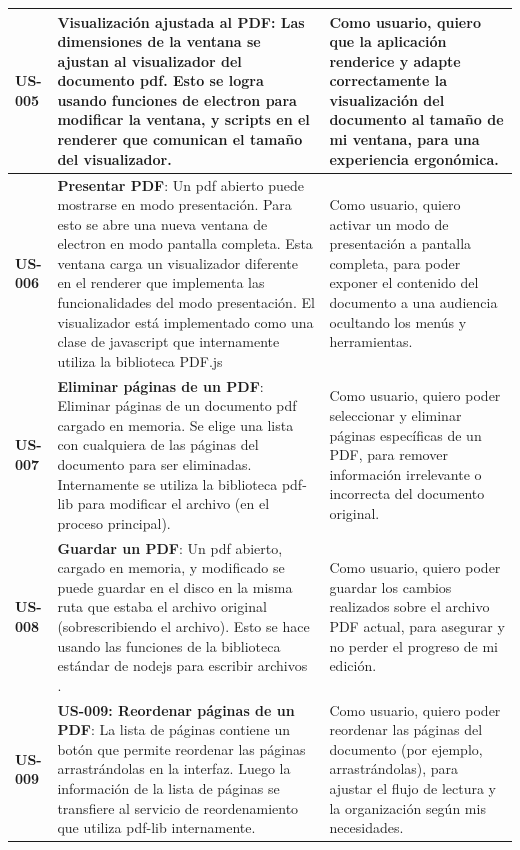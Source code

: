 \begin{longtable}{|l||p{7cm}|p{4.5cm}|}
\textbf{US-005} & \textbf{Visualización ajustada al PDF}: Las dimensiones de la ventana se ajustan al visualizador del documento pdf. Esto se logra usando funciones de electron para modificar la ventana, y scripts en el renderer que comunican el tamaño del visualizador. & Como usuario, quiero que la aplicación renderice y adapte correctamente la visualización del documento al tamaño de mi ventana, para una experiencia ergonómica.\\
\hline
\textbf{US-006} & \textbf{Presentar PDF}:  Un pdf abierto puede mostrarse en modo presentación. Para esto se abre una nueva ventana de electron en modo pantalla completa. Esta ventana carga un visualizador diferente en el renderer que implementa las funcionalidades del modo presentación. El visualizador está implementado como una clase de javascript que internamente utiliza la biblioteca PDF.js & Como usuario, quiero activar un modo de presentación a pantalla completa, para poder exponer el contenido del documento a una audiencia ocultando los menús y herramientas.\\
\hline
\textbf{US-007} & \textbf{Eliminar páginas de un PDF}:  Eliminar páginas de un documento pdf cargado en memoria. Se elige una lista con cualquiera de las páginas del documento para ser eliminadas. Internamente se utiliza la biblioteca pdf-lib para modificar el archivo (en el proceso principal). & Como usuario, quiero poder seleccionar y eliminar páginas específicas de un PDF, para remover información irrelevante o incorrecta del documento original.\\
\hline
\hline
\textbf{US-008} & \textbf{Guardar un PDF}:  Un pdf abierto, cargado en memoria, y modificado se puede guardar en el disco en la misma ruta que estaba el archivo original (sobrescribiendo el archivo). Esto se hace usando las funciones de la biblioteca estándar de nodejs para escribir archivos .& Como usuario, quiero poder guardar los cambios realizados sobre el archivo PDF actual, para asegurar y no perder el progreso de mi edición.\\
\hline
\hline
\textbf{US-009} & \textbf{US-009: Reordenar páginas de un PDF}: La lista de páginas contiene un botón que permite reordenar las páginas arrastrándolas en la interfaz. Luego la información de la lista de páginas se transfiere al servicio de reordenamiento que utiliza pdf-lib internamente.  & Como usuario, quiero poder reordenar las páginas del documento (por ejemplo, arrastrándolas), para ajustar el flujo de lectura y la organización según mis necesidades.\\

\end{longtable}
